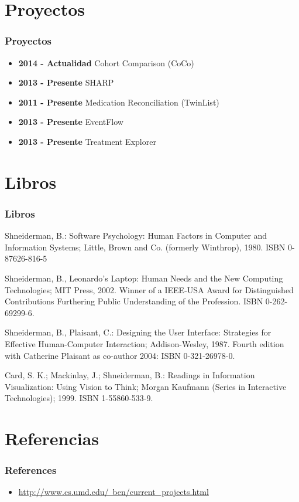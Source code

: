 \documentclass[11pt]{beamer}
\begin{document}
\section{Proyectos}
\begin{frame}
\frametitle{Proyectos}
\begin{itemize}
\item {\bf 2014 - Actualidad} Cohort Comparison (CoCo)
\item {\bf 2013 - Presente} SHARP
\item {\bf 2011 - Presente} Medication Reconciliation (TwinList)
\item {\bf 2013 - Presente} EventFlow
\item {\bf 2013 - Presente} Treatment Explorer


\end{itemize}
\end{frame}

\section{Libros}
\begin{frame}
\frametitle{Libros}

\item Shneiderman, B.: Software Psychology: Human Factors in Computer and Information Systems; Little, Brown and Co. (formerly Winthrop), 1980. ISBN 0-87626-816-5

\item Shneiderman, B., Leonardo's Laptop: Human Needs and the New Computing Technologies; MIT Press, 2002. Winner of a IEEE-USA Award for Distinguished Contributions Furthering Public Understanding of the Profession. ISBN 0-262-69299-6.

\item Shneiderman, B., Plaisant, C.: Designing the User Interface: Strategies for Effective Human-Computer Interaction; Addison-Wesley, 1987. Fourth edition with Catherine Plaisant as co-author 2004: ISBN 0-321-26978-0.

\item Card, S. K.; Mackinlay, J.; Shneiderman, B.: Readings in Information Visualization: Using Vision to Think; Morgan Kaufmann (Series in Interactive Technologies); 1999. ISBN 1-55860-533-9.
\end{frame}

\section{Referencias}
\begin{frame}
\frametitle{References}
\begin{itemize}
\item \href{http://www.cs.umd.edu/~ben/current_projects.html}{http://www.cs.umd.edu/~ben/current_projects.html}
\end{itemize}
\end{frame}
\end{document}
